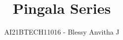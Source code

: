 \documentclass[journal,12pt,twocolumn]{IEEEtran}
\renewcommand\thesection{\arabic{section}}
\begin{document}
\makeatletter
{}
\makeatother
\let\StandardTheFigure\thefigure
\renewcommand{\thefigure}{\theproblem}
\def\putbox#1#2#3{\makebox[0in][l]{\makebox[#1][l]{}\raisebox{\baselineskip}[0in][0in]{\raisebox{#2}[0in][0in]{#3}}}}
     \def\rightbox#1{\makebox[0in][r]{#1}}
     \def\centbox#1{\makebox[0in]{#1}}
     \def\topbox#1{\raisebox{-\baselineskip}[0in][0in]{#1}}
     \def\midbox#1{\raisebox{-0.5\baselineskip}[0in][0in]{#1}}
\vspace{3cm}
\title{Pingala Series}
\author{AI21BTECH11016 - Blessy Anvitha J}
\maketitle
\tableofcontents
\renewcommand{\thefigure}{\theenumi}
\renewcommand{\thetable}{\theenumi}
\bigskip
\end{document}
